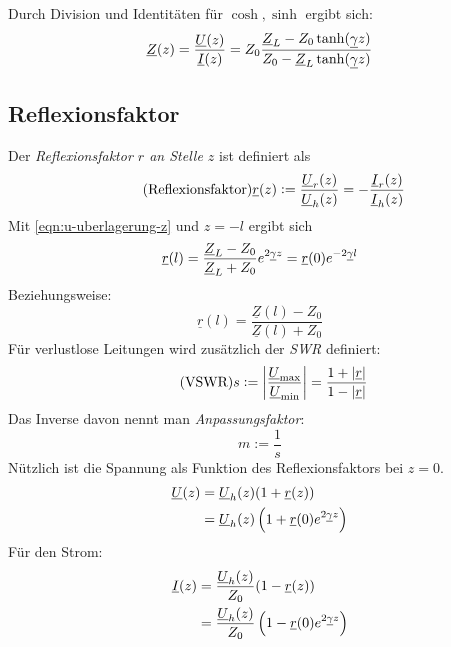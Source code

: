 \noindent
Durch Division und Identitäten für $\cosh, \sinh$ ergibt sich:
\begin{equation}
    \underline{Z}(z) = \frac{\underline{U}(z)}{\underline{I}(z)} = Z_0 \frac{\underline{Z}_L-Z_0 \tanh(\underline{\gamma} z)}{Z_0 - \underline{Z}_L \tanh(\underline{\gamma} z)}
\end{equation}

\subsection{Reflexionsfaktor}
Der \emph{Reflexionsfaktor $r$ an Stelle $z$} ist definiert als
\begin{equation}
    \tag{Reflexionsfaktor}
    \underline{r}(z) := \frac{\underline{U}_r(z)}{\underline{U}_h(z)} = - \frac{\underline{I}_r(z)}{\underline{I}_h(z)}
\end{equation}
Mit \eqref{eqn:u-uberlagerung-z} und $z=-l$ ergibt sich
\begin{equation}
    \underline{r}(l) = \frac{\underline{Z}_L-Z_0}{\underline{Z}_L+Z_0} e^{2\underline{\gamma} z} = \underline{r}(0) e^{-2\underline{\gamma} l}
\end{equation}
Beziehungsweise:
\begin{equation}
   \underline{r}(l) = \frac{\underline{Z}(l)-Z_0}{\underline{Z}(l)+Z_0} 
\end{equation}
\noindent
Für verlustlose Leitungen wird zusätzlich der \emph{SWR} definiert:
\begin{equation}
    \tag{VSWR}
    s := \left| \frac{\underline{U}_\text{max}}{\underline{U}_\text{min}} \right| = \frac{1+|\underline{r}|}{1-|\underline{r}|}
\end{equation}
Das Inverse davon nennt man \emph{Anpassungsfaktor}:
\begin{equation}
    \tag{Anpassungsfaktor}
    m := \frac{1}{s}
\end{equation}
Nützlich ist die Spannung als Funktion des Reflexionsfaktors bei $z=0$.
\begin{equation}
    \begin{aligned}
        \underline{U}(z) &= \underline{U}_h(z)(1+\underline{r}(z))\\
                         &= \underline{U}_h(z)\left(1+\underline{r}(0) e^{2\underline{\gamma} z}\right)
    \end{aligned}
    \label{eqn:u-r}
\end{equation}
Für den Strom:
\begin{equation}
    \begin{aligned}
        \underline{I}(z) &= \frac{\underline{U}_h(z)}{Z_0}(1-\underline{r}(z))\\
                         &= \frac{\underline{U}_h(z)}{Z_0}\left(1-\underline{r}(0) e^{2\underline{\gamma} z}\right)
    \end{aligned}
    \label{eqn:i-r}
\end{equation}

